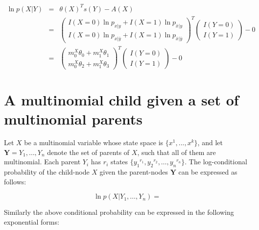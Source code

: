 \documentclass[11pt, oneside]{article}   	%
\numberwithin{figure}{section}
\numberwithin{equation}{section}
\numberwithin{table}{section}
\begin{document}
\begin{itemize}
\begin{eqnarray*}
\ln p(X|Y) &=& \theta(X)^T s(Y) - A(X) \\
&=&
\begin{pmatrix}
I(X=0)\ln p_{x|y}  + I(X=1)\ln p_{\bar{x}|y}\\
I(X=0)\ln p_{x|\bar{y}}  + I(X=1)\ln p_{\bar{x}|\bar{y}}
\end{pmatrix}^T
\begin{pmatrix}
I(Y=0) \\
I(Y=1)
\end{pmatrix}
- 0\\
&=&
\begin{pmatrix}
m^X_0\theta_0  +  m^X_1\theta_1\\
m^X_0\theta_2  + m^X_1\theta_3
\end{pmatrix}^T
\begin{pmatrix}
I(Y=0) \\
I(Y=1)
\end{pmatrix}
- 0
\end{eqnarray*}

\end{itemize}

\newpage
\section{A multinomial child given a set of multinomial parents}

Let $X$ be a multinomial variable whose state space is $\{x^1,...,x^k\}$, and let $\mathbf{Y} =Y_1,\ldots,Y_n$ denote the set of parents of $X$, such that all of them are multinomial. Each parent $Y_i$ has $r_i$ states $\{ {y_1}^{r_1}, {y_2}^{r_2},\ldots, {y_n}^{r_n} \}$. The log-conditional probability of the child-node $X$ given the parent-nodes $\mathbf{Y}$ can be expressed as follows:

$$ \ln p(X|Y_1,\ldots,Y_n) = $$

Similarly the above conditional probability can be expressed in the following exponential forms:
\end{document}
